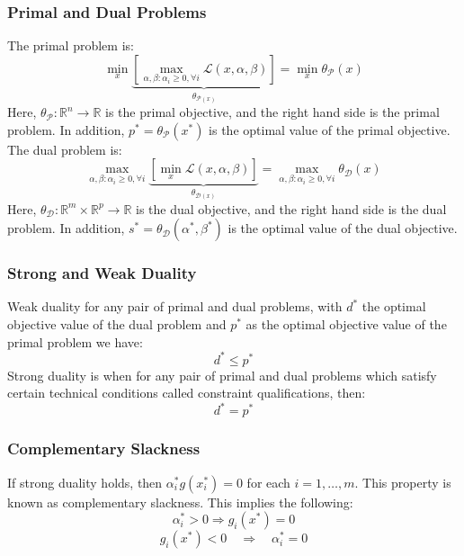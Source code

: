 \documentclass[twoside,twocolumn]{article}
\begin{document}
\subsubsection{Primal and Dual Problems}
The primal problem is:
\begin{equation}
  \min _ { x } \underbrace { \left[ \max _ { \alpha , \beta : \alpha _ { i } \geq 0 , \forall i } \mathcal { L } ( x , \alpha , \beta ) \right] } _ { \theta _ { \mathcal { P } ( x ) } } = \min _ { x } \theta _ { \mathcal { P } } ( x )
\end{equation}
Here, $\theta_{\mathcal{P}} : \mathbb{R}^n \to \mathbb{R}$ is the primal objective, and
the right hand side is the primal problem. In addition,  $p^* = \theta_{\mathcal{P}}(x^*)$
is the optimal value of the primal objective. \\
The dual problem is:
\begin{equation}
  \max _ { \alpha , \beta : \alpha _ { i } \geq 0 , \forall i  } \underbrace { \left[ \min _ { x } \mathcal { L } ( x , \alpha , \beta ) \right] } _ { \theta _ { \mathcal { D } ( x ) } } = \max _ { \alpha , \beta : \alpha _ { i } \geq 0 , \forall i  } \theta _ { \mathcal { D } } ( x )
\end{equation}
Here, $\theta_{\mathcal{D}} : \mathbb{R}^m \times \mathbb{R}^p \to \mathbb{R}$
is the dual objective, and
the right hand side is the dual problem. In addition,
$s^* = \theta_{\mathcal{D}}(\alpha^*, \beta^*)$
is the optimal value of the dual objective.
\subsubsection{Strong and Weak Duality}
Weak duality for any pair of primal and dual problems, with $d^*$ the optimal
objective value of the dual problem and $p^*$ as the optimal objective value
of the primal problem we have:
\begin{equation}
  d^* \leq p^*
\end{equation}
Strong duality is when for any pair of primal and dual problems which satisfy
certain technical conditions called constraint qualifications, then:
\begin{equation}
  d^* = p^*
\end{equation}
\subsubsection{Complementary Slackness}
If strong duality holds, then $\alpha^*_i g(x^*_i) = 0$ for each $i=1,\hdots,m$.
This property is known as complementary slackness. This implies the following:
\begin{equation}
  \alpha _ { i } ^ { * } > 0 \Longrightarrow g _ { i } \left( x ^ { * } \right) = 0
\end{equation}
\begin{equation}
  g _ { i } \left( x ^ { * } \right) < 0 \quad \Longrightarrow \quad \alpha _ { i } ^ { * } = 0
\end{equation}
\end{document}
